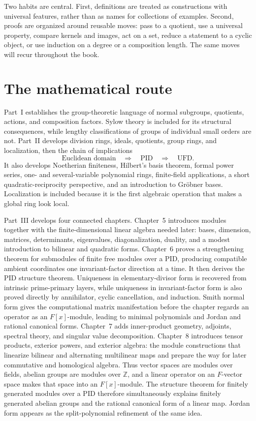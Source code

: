 Two habits are central.  First, definitions are treated as constructions with
universal features, rather than as names for collections of examples.  Second,
proofs are organized around reusable moves: pass to a quotient, use a universal
property, compare kernels and images, act on a set, reduce a statement to a
cyclic object, or use induction on a degree or a composition length.  The same
moves will recur throughout the book.

\section{The mathematical route}

Part~I establishes the group-theoretic language of normal subgroups, quotients,
actions, and composition factors.  Sylow theory is included for its structural
consequences, while lengthy classifications of groups of individual small
orders are not.  Part~II develops division rings, ideals, quotients, group
rings, and localization, then the chain
of implications
\[
  \text{Euclidean domain}\quad\Longrightarrow\quad\text{PID}
  \quad\Longrightarrow\quad\text{UFD}.
\]
It also develops Noetherian finiteness, Hilbert's basis theorem, formal power
series, one- and several-variable polynomial rings, finite-field applications,
a short quadratic-reciprocity perspective, and an introduction to Gr\"obner
bases.  Localization is included because it is the first algebraic operation
that makes a global ring look local.

Part~III develops four connected chapters. Chapter~5 introduces modules
together with the finite-dimensional linear algebra needed later: bases,
dimension, matrices, determinants, eigenvalues, diagonalization, duality,
and a modest introduction to bilinear and quadratic forms.
Chapter~6 proves a strengthening theorem for submodules of finite free
modules over a PID, producing compatible ambient coordinates one
invariant-factor direction at a time. It then derives the PID structure
theorem. Uniqueness in elementary-divisor form is recovered from intrinsic
prime-primary layers, while uniqueness in invariant-factor form is also
proved directly by annihilator, cyclic cancellation, and induction. Smith
normal form gives the computational
matrix manifestation before the chapter regards an operator as an
\(F[x]\)-module, leading to minimal polynomials and Jordan and rational
canonical forms. Chapter~7 adds inner-product geometry, adjoints, spectral
theory, and singular value decomposition. Chapter~8 introduces tensor
products, exterior powers, and exterior algebra: the module constructions
that linearize bilinear and alternating multilinear maps and prepare the way
for later commutative and homological algebra. Thus vector spaces are
modules over fields, abelian groups are modules over \(\mathbb Z\), and a
linear operator on an \(F\)-vector space makes that space into an
\(F[x]\)-module. The structure theorem for finitely generated modules over a
PID therefore simultaneously explains finitely generated abelian groups and
the rational canonical form of a linear map. Jordan form appears as the
split-polynomial refinement of the same idea.

